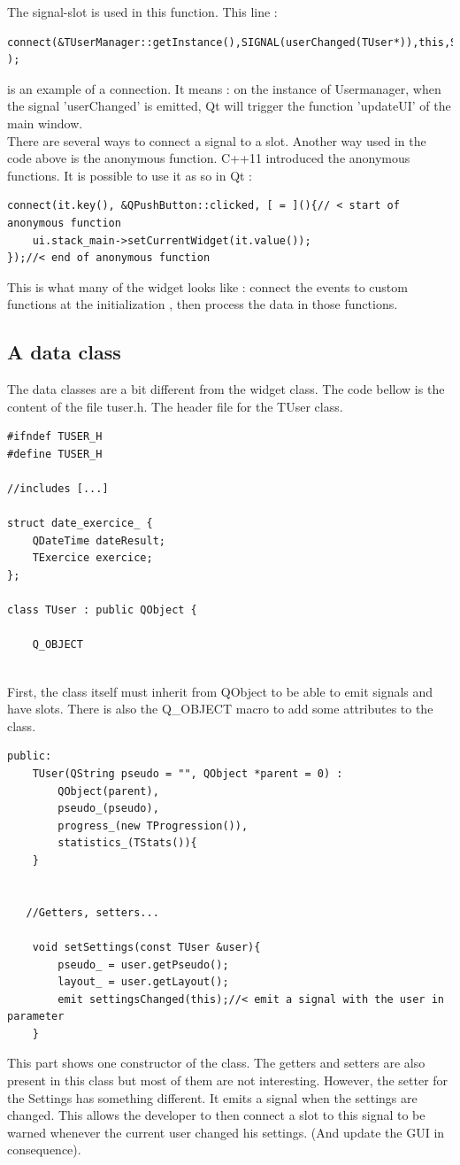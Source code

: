 The signal-slot is used in this function. This line : 
\begin{lstlisting}
connect(&TUserManager::getInstance(),SIGNAL(userChanged(TUser*)),this,SLOT(updateUI(TUser*)) );
\end{lstlisting}
is an example of a connection. It means : on the instance of Usermanager, when the signal 'userChanged' is emitted, Qt will trigger the function 'updateUI' of the main window.\\
There are several ways to connect a signal to a slot. Another way used in the code above is the anonymous function. C++11 introduced the anonymous functions. It is possible to use it as so in Qt :
\begin{lstlisting}
connect(it.key(), &QPushButton::clicked, [ = ](){// < start of anonymous function
	ui.stack_main->setCurrentWidget(it.value());
});//< end of anonymous function
\end{lstlisting}

This is what many of the widget looks like : connect the events to custom functions at the initialization , then process the data in those functions.

\subsection{A data class}

The data classes are a bit different from the widget class. The code bellow is the content of the file tuser.h. The header file for the TUser class.
\begin{lstlisting}
#ifndef TUSER_H
#define TUSER_H

//includes [...]

struct date_exercice_ {
    QDateTime dateResult;
    TExercice exercice;
};

class TUser : public QObject {

    Q_OBJECT
    
\end{lstlisting}
First, the class itself must inherit from QObject to be able to emit signals and have slots. There is also the Q\_OBJECT macro to add some attributes to the class.

\begin{lstlisting}
public:
    TUser(QString pseudo = "", QObject *parent = 0) :
        QObject(parent),
        pseudo_(pseudo),
        progress_(new TProgression()),
        statistics_(TStats()){
    }


   //Getters, setters...

    void setSettings(const TUser &user){
        pseudo_ = user.getPseudo();
        layout_ = user.getLayout();
        emit settingsChanged(this);//< emit a signal with the user in parameter
    }
\end{lstlisting}
This part shows one constructor of the class. The getters and setters are also present in this class but most of them are not interesting. However, the setter for the Settings has something different. It emits a signal when the settings are changed. This allows the developer to then connect a slot to this signal to be warned whenever the current user changed his settings. (And update the GUI in consequence).


